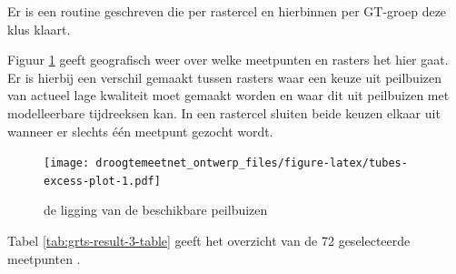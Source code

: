 \documentclass[11pt,]{book}
\begin{document}
Er is een routine geschreven die per rastercel en hierbinnen per
GT-groep deze klus klaart.

Figuur \ref{fig:tubes-excess-plot} geeft geografisch weer over welke
meetpunten en rasters het hier gaat. Er is hierbij een verschil gemaakt
tussen rasters waar een keuze uit peilbuizen van actueel lage kwaliteit
moet gemaakt worden en waar dit uit peilbuizen met modelleerbare
tijdreeksen kan. In een rastercel sluiten beide keuzen elkaar uit
wanneer er slechts één meetpunt gezocht wordt.

\begin{figure}
\centering
\texttt{[image: droogtemeetnet\_ontwerp\_files/figure-latex/tubes-excess-plot-1.pdf]}
\caption{\label{fig:tubes-excess-plot}de ligging van de beschikbare
peilbuizen}
\end{figure}

Tabel \ref{tab:grts-result-3-table} geeft het overzicht van de 72
geselecteerde meetpunten .
\end{document}
